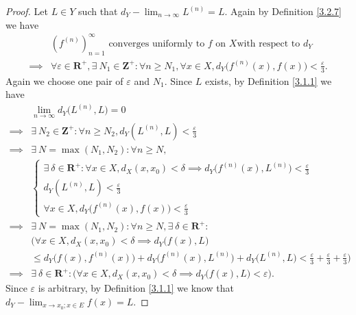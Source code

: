 \begin{proof}
    Let \(L \in Y\) such that \(d_Y - \lim_{n \to \infty} L^{(n)} = L\).
    Again by Definition \ref{3.2.7} we have
    \begin{align*}
                 & (f^{(n)})_{n = 1}^\infty \text{ converges uniformly to } f \text{ on } X \text{with respect to } d_Y                                                              \\
        \implies & \forall \varepsilon \in \mathbf{R}^+, \exists\ N_1 \in \mathbf{Z}^+ : \forall n \geq N_1, \forall x \in X, d_Y\big(f^{(n)}(x), f(x)\big) < \frac{\varepsilon}{3}.
    \end{align*}
    Again we choose one pair of \(\varepsilon\) and \(N_1\).
    Since \(L\) exists, by Definition \ref{3.1.1} we have
    \begin{align*}
                 & \lim_{n \to \infty} d_Y\big(L^{(n)}, L\big) = 0                                                                                                                              \\
        \implies & \exists\ N_2 \in \mathbf{Z}^+ : \forall n \geq N_2, d_Y(L^{(n)}, L) < \frac{\varepsilon}{3}                                                                                  \\
        \implies & \exists\ N = \max(N_1, N_2) : \forall n \geq N,                                                                                                                              \\
                 & \begin{cases}
                       \exists\ \delta \in \mathbf{R}^+ : \forall x \in X, d_X(x, x_0) < \delta \implies d_Y\big(f^{(n)}(x), L^{(n)}\big) < \frac{\varepsilon}{3} \\
                       d_Y(L^{(n)}, L) < \frac{\varepsilon}{3}                                                                                                    \\
                       \forall x \in X, d_Y\big(f^{(n)}(x), f(x)\big) < \frac{\varepsilon}{3}
                   \end{cases}                                   \\
        \implies & \exists\ N = \max(N_1, N_2) : \forall n \geq N, \exists\ \delta \in \mathbf{R}^+ :                                                                                           \\
                 & \Big(\forall x \in X, d_X(x, x_0) < \delta \implies d_Y\big(f(x), L\big)                                                                                                     \\
                 & \leq d_Y\big(f(x), f^{(n)}(x)\big) + d_Y\big(f^{(n)}(x), L^{(n)}\big) + d_Y\big(L^{(n)}, L\big) < \frac{\varepsilon}{3} + \frac{\varepsilon}{3} + \frac{\varepsilon}{3}\Big) \\
        \implies & \exists\ \delta \in \mathbf{R}^+ : \Big(\forall x \in X, d_X(x, x_0) < \delta \implies d_Y\big(f(x), L\big) < \varepsilon\Big).
    \end{align*}
    Since \(\varepsilon\) is arbitrary, by Definition \ref{3.1.1} we know that \(d_Y - \lim_{x \to x_0 ; x \in E} f(x) = L\).
\end{proof}

